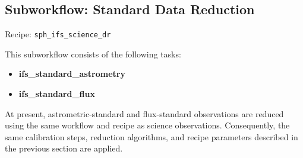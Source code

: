 
\subsection{Subworkflow: Standard Data Reduction}

Recipe:
\texttt{sph\_ifs\_science\_dr}

This subworkflow consists of the following tasks:

\begin{itemize}
\item \textbf{ifs\_standard\_astrometry}
\item \textbf{ifs\_standard\_flux}
\end{itemize}

At present, astrometric-standard and flux-standard observations are reduced using the same workflow and recipe as science observations. Consequently, the same calibration steps, reduction algorithms, and recipe parameters described in the previous section are applied.
